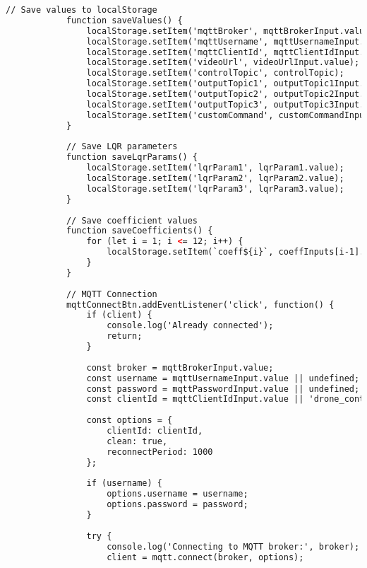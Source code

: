 \begin{lstlisting}[language=html]
            // Save values to localStorage
            function saveValues() {
                localStorage.setItem('mqttBroker', mqttBrokerInput.value);
                localStorage.setItem('mqttUsername', mqttUsernameInput.value);
                localStorage.setItem('mqttClientId', mqttClientIdInput.value);
                localStorage.setItem('videoUrl', videoUrlInput.value);
                localStorage.setItem('controlTopic', controlTopic);
                localStorage.setItem('outputTopic1', outputTopic1Input.value);
                localStorage.setItem('outputTopic2', outputTopic2Input.value);
                localStorage.setItem('outputTopic3', outputTopic3Input.value);
                localStorage.setItem('customCommand', customCommandInput.value);
            }
            
            // Save LQR parameters
            function saveLqrParams() {
                localStorage.setItem('lqrParam1', lqrParam1.value);
                localStorage.setItem('lqrParam2', lqrParam2.value);
                localStorage.setItem('lqrParam3', lqrParam3.value);
            }
            
            // Save coefficient values
            function saveCoefficients() {
                for (let i = 1; i <= 12; i++) {
                    localStorage.setItem(`coeff${i}`, coeffInputs[i-1].value);
                }
            }
    
            // MQTT Connection
            mqttConnectBtn.addEventListener('click', function() {
                if (client) {
                    console.log('Already connected');
                    return;
                }
    
                const broker = mqttBrokerInput.value;
                const username = mqttUsernameInput.value || undefined;
                const password = mqttPasswordInput.value || undefined;
                const clientId = mqttClientIdInput.value || 'drone_control_panel_' + Math.random().toString(16).substr(2, 8);
    
                const options = {
                    clientId: clientId,
                    clean: true,
                    reconnectPeriod: 1000
                };
    
                if (username) {
                    options.username = username;
                    options.password = password;
                }
    
                try {
                    console.log('Connecting to MQTT broker:', broker);
                    client = mqtt.connect(broker, options);
                    

\end{lstlisting}
